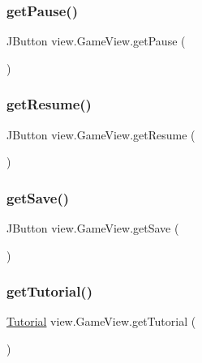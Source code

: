 \subsubsection{\texorpdfstring{get\+Pause()}{getPause()}}
{\footnotesize\ttfamily J\+Button view.\+Game\+View.\+get\+Pause (\begin{DoxyParamCaption}{ }\end{DoxyParamCaption})}

\hypertarget{classview_1_1_game_view_aafa4556cc05c088d2ac204f4b78955ca}{}\label{classview_1_1_game_view_aafa4556cc05c088d2ac204f4b78955ca} 
\subsubsection{\texorpdfstring{get\+Resume()}{getResume()}}
{\footnotesize\ttfamily J\+Button view.\+Game\+View.\+get\+Resume (\begin{DoxyParamCaption}{ }\end{DoxyParamCaption})}

\hypertarget{classview_1_1_game_view_a0da97c49ae783ad3d07bb71c80d3ed81}{}\label{classview_1_1_game_view_a0da97c49ae783ad3d07bb71c80d3ed81} 
\subsubsection{\texorpdfstring{get\+Save()}{getSave()}}
{\footnotesize\ttfamily J\+Button view.\+Game\+View.\+get\+Save (\begin{DoxyParamCaption}{ }\end{DoxyParamCaption})}

\hypertarget{classview_1_1_game_view_af2d07759d1cde26a4a4d8176baeb0739}{}\label{classview_1_1_game_view_af2d07759d1cde26a4a4d8176baeb0739} 
\subsubsection{\texorpdfstring{get\+Tutorial()}{getTutorial()}}
{\footnotesize\ttfamily \hyperlink{classview_1_1_tutorial}{Tutorial} view.\+Game\+View.\+get\+Tutorial (\begin{DoxyParamCaption}{ }\end{DoxyParamCaption})}



